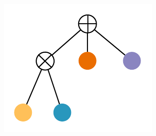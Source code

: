 \documentclass[final]{beamer}
\begin{document}
\begin{frame}{}
\begin{textblock}{25.7}
{\begin{minipage}[t]{7.2cm}
      \includegraphics[width=\linewidth]{figures/learnspn-2}
    \end{minipage}}\begin{minipage}[t]{5.724cm}

\end{minipage}
\end{textblock}
\end{frame}
\end{document}
